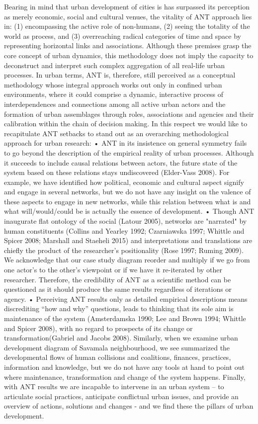 \documentclass[11pt]{report}
\begin{document}
Bearing in mind that urban development of cities is has surpassed its perception as merely economic, social and cultural venues, the vitality of ANT approach lies in: (1) encompassing the active role of non-humans, (2) seeing the totality of the world as process, and (3) overreaching radical categories of time and space by representing horizontal links and associations. Although these premises grasp the core concept of urban dynamics, this methodology does not imply the capacity to deconstruct and interpret such complex aggregation of all real-life urban processes. In urban terms, ANT is, therefore, still perceived as a conceptual methodology whose integral approach works out only in confined urban environments, where it could comprise a dynamic, interactive process of interdependences and connections among all active urban actors and the formation of urban assemblages through roles, associations and agencies and their calibration within the chain of decision making.
In this respect we would like to recapitulate ANT setbacks to stand out as an overarching methodological approach for urban research:
•	ANT in its insistence on general symmetry fails to go beyond the description of the empirical reality of urban processes. Although it succeeds to include causal relations between actors, the future state of the system based on these relations stays undiscovered (Elder-Vass 2008). For example, we have identified how political, economic and cultural aspect signify and engage in several networks, but we do not have any insight on the valence of these aspects to engage in new networks, while this relation between what is and what will/would/could be is actually the essence of development.
•	Though ANT inaugurate flat ontology of the social (Latour 2005), networks are "narrated" by human constituents (Collins and Yearley 1992; Czarniawska 1997; Whittle and Spicer 2008;  Marshall and Staeheli 2015) and interpretations and translations are chiefly the product of the researcher’s positionality  (Rose 1997;  Ruming 2009). We acknowledge that our case study diagram reorder and multiply if we go from one actor’s to the other’s viewpoint or if we have it re-iterated by other researcher. Therefore, the credibility of ANT as a scientific method can be questioned as it should produce the same results regardless of iterations or agency.
•	Perceiving ANT results only as detailed empirical descriptions means discrediting “how and why” questions, leads to thinking that its sole aim is maintenance of the system   (Amsterdamska 1990; Lee and Brown 1994; Whittle and Spicer 2008), with no regard to prospects of its change or transformation(Gabriel and Jacobs 2008). Similarly, when we examine urban development diagram of Savamala neighbourhood, we see summarized the developmental ﬂows of human collisions and coalitions, finances, practices, information and knowledge, but we do not have any tools at hand to point out where maintenance, transformation and change of the system happens. Finally, with ANT results we are incapable to intervene in an urban system – to articulate social practices, anticipate conflictual urban issues, and provide an overview of actions, solutions and changes - and we find these the pillars of urban development. 
\end{document}
